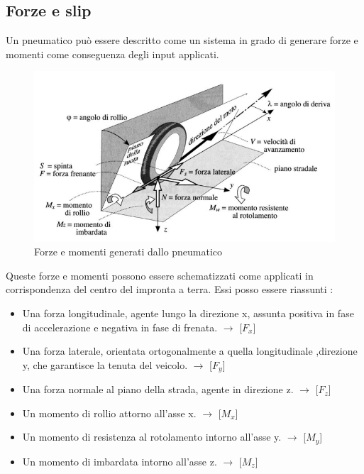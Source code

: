 \subsection{Forze e slip}
Un pneumatico può essere descritto come un sistema in grado di generare forze e momenti come conseguenza degli input applicati.
\begin{figure}[ht]
    \centering
    \includegraphics[scale=0.9]{Immagini/Tyres/tyre_forces.png}
    \caption{Forze e momenti generati dallo pneumatico}
    \label{fig:tyre_forces}
\end{figure}
Queste forze e momenti possono essere schematizzati come applicati in corrispondenza del centro del impronta a terra. Essi posso essere riassunti :
\begin{itemize}
    \item Una forza longitudinale, agente lungo la direzione x, assunta positiva in fase di
    accelerazione e negativa in fase di frenata. $\longrightarrow$ [$F_x$]
    \item Una forza laterale, orientata ortogonalmente a quella longitudinale ,direzione y, che garantisce la tenuta del veicolo. $\longrightarrow$ [$F_y$]
    \item Una forza normale al piano della strada, agente in direzione z. $\longrightarrow$ [$F_z$]
    \item Un momento di rollio attorno all’asse x. $\longrightarrow$ [$M_x$]
    \item Un momento di resistenza al rotolamento intorno all’asse y. $\longrightarrow$ [$M_y$]
    \item Un momento di imbardata intorno all’asse z. $\longrightarrow$ [$M_z$] 

\end{itemize}




